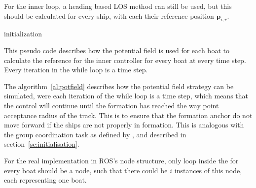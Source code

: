 For the inner loop, a heading based \ac{LOS} method can still be used,
but this should be calculated for every ship, with each their
reference position $\mathbf{p}_{i,r}$.

\begin{algorithm}[H]
	initialization\;
	\caption{This pseudo code describes how the potential field is used
	for each boat to calculate the reference for the inner controller
	for every boat at every time step. Every iteration in the while loop
	is a time step.\vspace{6pt}}
	\label{al:potfield}
\end{algorithm}

The algorithm~\vref{al:potfield} describes how the potential field
strategy can be simulated, were each iteration of the while loop is a
time step, which means that the control will continue until the
formation has reached the way point acceptance radius of the track.
This is to ensure that the formation anchor do not move forward if the
ships are not properly in formation. This is analogous with the group
coordination task as defined by \citep{thorvaldsen}, and described in
section~\ref{sc:initialisation}.

For the real implementation in \ac{ROS}'s node structure, only loop
inside the for every boat should be a node, such that there could be
$i$ instances of this node, each representing one boat. 





